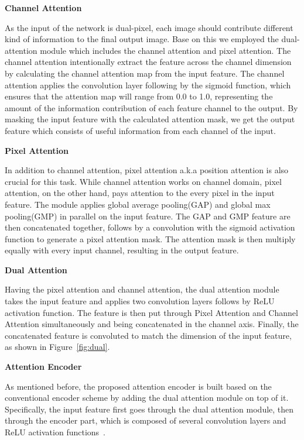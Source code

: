\documentclass[final]{cvpr}
\begin{document}
\textbf{Channel Attention}

As the input of the network is dual-pixel, each image should contribute different kind of information to the final output image. Base on this we employed the dual-attention module which includes the channel attention and pixel attention. The channel attention intentionally extract the feature across the channel dimension by calculating the channel attention map from the input feature. The channel attention applies the convolution layer following by the sigmoid function, which ensures that the attention map will range from 0.0 to 1.0, representing the amount of the information contribution of each feature channel to the output. By masking the input feature with the calculated attention mask,  we get the output feature which consists of useful information from each channel of the input.

\textbf{Pixel Attention}

In addition to channel attention, pixel attention a.k.a position attention is also crucial for this task. While channel attention works on channel domain, pixel attention, on the other hand, pays attention to the every pixel in the input feature. The module applies global average pooling(GAP) and global max pooling(GMP) in parallel on the input feature. The GAP and GMP feature are then concatenated together, follows by a  convolution with the sigmoid activation function to generate a pixel attention mask. The attention mask is then multiply equally with every input channel, resulting in the output feature.

\textbf{Dual Attention}

Having the pixel attention and channel attention, the dual attention module takes the input feature and applies two  convolution layers follows by ReLU~\cite{relu} activation function. The feature is then put through Pixel Attention and Channel Attention simultaneously and being concatenated in the channel axis. Finally, the concatenated feature is  convoluted to match the dimension of the input feature, as shown in Figure~\ref{fig:dual}.

\textbf{Attention Encoder}

As mentioned before, the proposed attention encoder is built based on the conventional encoder scheme by adding the dual attention module on top of it. Specifically, the input feature first goes through the dual attention module, then through the encoder part, which is composed of several  convolution layers and ReLU activation functions~\cite{relu}.
\end{document}

